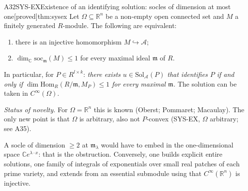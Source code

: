 \documentclass[11pt,a4paper,oneside]{report}
\newcommand{\badge}[2]{\textcolor{#1}{\textsf{\footnotesize[#2]}}}
\newcommand{\proved}{\badge{cC}{proved}}
\newcommand{\R}{\mathbb{R}}\newcommand{\C}{\mathbb{C}}\newcommand{\N}{\mathbb{N}}\newcommand{\Z}{\mathbb{Z}}\newcommand{\Q}{\mathbb{Q}}
\newenvironment{dimcard}[5]{\par\Needspace{12\baselineskip}\begin{dimcardbox}{#1}{#2}{#3}{#4}{#5}}{\end{dimcardbox}}
\begin{document}
\begin{dimcard}{A32}{SYS-EX}{Existence of an identifying solution: socles of dimension at most one}{\proved}{thm:sysex}
Let $\Omega\subseteq\R^n$ be a non-empty open connected set and $M$ a finitely generated $R$-module. The following are equivalent:
\begin{enumerate}[label=(\roman*)]
\item there is an injective homomorphism $M\hookrightarrow\mathcal A$;
\item $\dim_\C\mathrm{soc}_{\mathfrak m}(M)\le1$ for every maximal ideal $\mathfrak m$ of $R$.
\end{enumerate}
In particular, for $P\in R^{l\times k}$: \emph{there exists $u\in\mathrm{Sol}_{\mathcal A}(P)$ that identifies $P$ if and only if $\dim\mathrm{Hom}_R(R/\mathfrak m,M_P)\le1$ for every maximal $\mathfrak m$.} The solution can be taken in $C^\infty(\Omega)$.

\emph{Status of novelty.} For $\Omega=\R^n$ this is known (Oberst; Pommaret; Macaulay). The only new point is that $\Omega$ is arbitrary, also not $P$-convex (SYS-EX, $\Omega$ arbitrary; see A35).
\end{dimcard}

\begin{proofidea}
A socle of dimension $\ge2$ at $\mathfrak m_\lambda$ would have to embed in the one-dimensional space $\C e^{\lambda\cdot x}$: that is the obstruction. Conversely, one builds explicit entire solutions, one family of integrals of exponentials over small real patches of each prime variety, and extends from an essential submodule using that $C^\infty(\R^n)$ is injective.
\end{proofidea}
\end{document}

